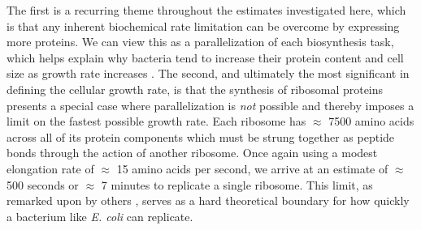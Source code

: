 The first is a recurring theme throughout the estimates investigated here, which
is that any inherent biochemical rate limitation can be overcome by expressing
more proteins. We can view this as a parallelization of each biosynthesis task,
which helps explain why bacteria tend to increase their protein content and
cell size as growth rate increases \citep{ojkic2019}. The second, and
ultimately the most significant in defining the cellular growth rate, is that
the synthesis of ribosomal proteins presents a special case where
parallelization is \textit{not} possible and thereby imposes a limit on the
fastest possible growth rate. Each ribosome has $\approx$ 7500 amino acids
across all of its protein components which must be strung together as peptide
bonds through the action of another ribosome. Once again using a modest
elongation rate of $\approx$ 15 amino acids per second, we arrive at an estimate of
$\approx$ 500 seconds or $\approx$ 7 minutes to replicate a single ribosome.
This limit, as remarked upon by others \citep{dill2011}, serves as a hard
theoretical boundary for how quickly a bacterium like \textit{E. coli} can
replicate.
%

